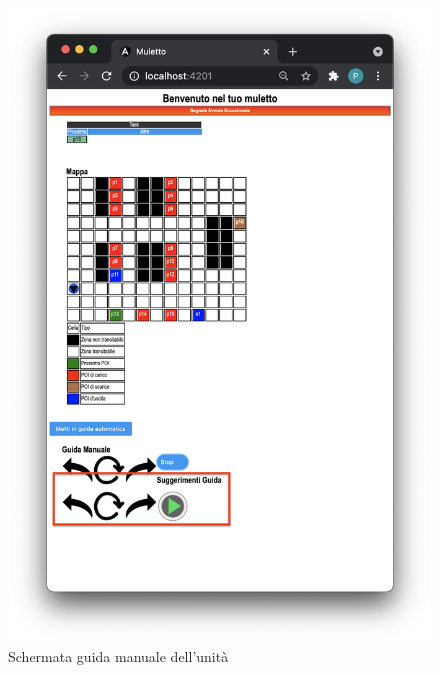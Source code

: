 \begin{itemize}
\begin{figure}[H]
          \includegraphics[scale=0.45]{res/images/suggerimenti.png}
          \caption{Schermata guida manuale dell'unità}
    \end{figure}
\end{itemize}

